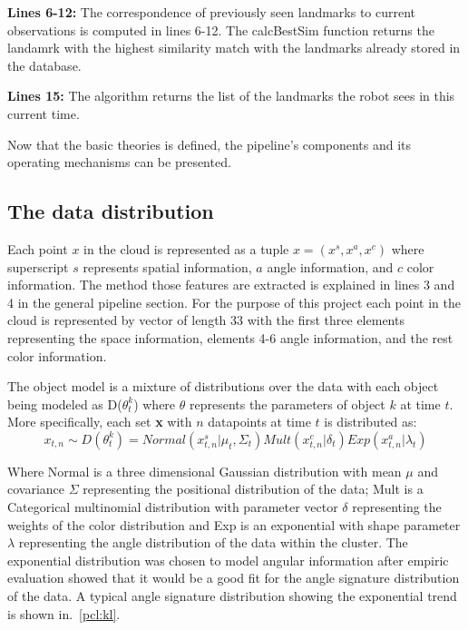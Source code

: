 \documentclass[]{article}
\begin{document}
    \textbf{Lines 6-12:} The correspondence of previously seen landmarks to current observations is computed in lines 6-12. The calcBestSim function returns the landamrk with the highest similarity match with the landmarks already stored in the database.

    \textbf{Lines 15:} The algorithm returns the list of the landmarks the robot sees in this current time.

  





Now that the basic theories is defined, the pipeline's components and its operating mechanisms can be presented.
\subsection{The data distribution}
\label{data:dist}

Each point $x$ in the cloud is represented as a tuple $x =(x^s, x^a, x^c) $ where superscript $s$ represents spatial information, $a$ angle information, and $c$ color information. The method those features are extracted is explained in lines 3 and 4 in the general pipeline section. For the purpose of this project each point in the cloud is represented by vector of length 33 with the first three elements representing the space information, elements 4-6 angle information, and the rest color information.

The object model is a mixture of distributions over the data with each object being modeled as D($\theta_t^k$) where $\theta$ represents the parameters of object $k$ at time $t$. More specifically, each set \textbf{x} with $n$ datapoints at time $t$ is distributed as:
$$ x_{t,n} \sim D(\theta_t^k) = Normal(x_{t,n}^s| \mu_t, \Sigma_t) Mult(x_{t,n}^c | \delta_t) Exp(x_{t,n}^a | \lambda_t) $$

Where Normal is a three dimensional Gaussian distribution with mean $\mu$ and covariance $\Sigma$ representing the positional distribution of the data; Mult is a Categorical multinomial distribution with parameter vector $\delta$ representing the weights of the color distribution and Exp is an exponential with shape parameter $\lambda$ representing the angle distribution of the data within the cluster. The exponential distribution was chosen to model angular information after empiric evaluation showed that it would be a good fit for the angle signature distribution of the data. A typical angle signature distribution showing the exponential trend is shown in.~\ref{pcl:kl}.
\end{document}

